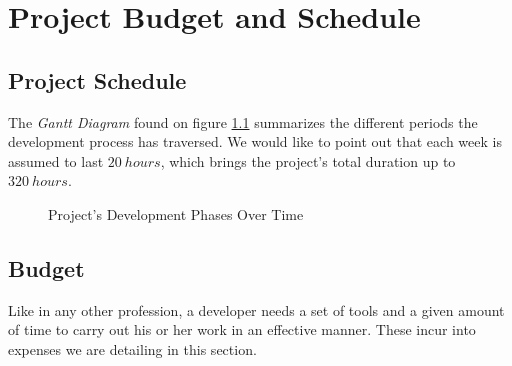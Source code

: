 \chapter{Project Budget and Schedule}
    \section{Project Schedule}
        The \textit{Gantt Diagram} found on figure \ref{fig:gantt} summarizes the different periods the development process has traversed. We would like to point out that each week is assumed to last $20\ hours$, which brings the project's total duration up to $320\ hours$.\\

        \begin{figure}
            \centering
            \caption{Project's Development Phases Over Time}
            \label{fig:gantt}
        \end{figure}

    \section{Budget}
        Like in any other profession, a developer needs a set of tools and a given amount of time to carry out his or her work in an effective manner. These incur into expenses we are detailing in this section.\\

